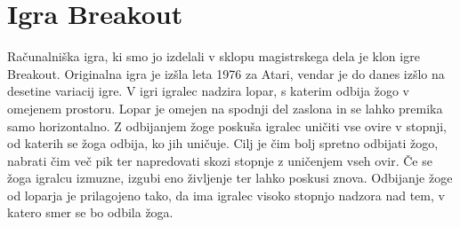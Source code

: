 \documentclass[12pt,a4paper,twoside]{book}
\begin{document}
\section{Igra Breakout}
Računalniška igra, ki smo jo izdelali v sklopu magistrskega dela je klon igre Breakout. Originalna igra je izšla leta 1976 za Atari, vendar je do danes izšlo na desetine variacij igre. V igri igralec nadzira lopar, s katerim odbija žogo v omejenem prostoru. Lopar je omejen na spodnji del zaslona in se lahko premika samo horizontalno. Z odbijanjem žoge poskuša igralec uničiti vse ovire v stopnji, od katerih se žoga odbija, ko jih uničuje. Cilj je čim bolj spretno odbijati žogo, nabrati čim več pik ter napredovati skozi stopnje z uničenjem vseh ovir. Če se žoga igralcu izmuzne, izgubi eno življenje ter lahko poskusi znova. Odbijanje žoge od loparja je prilagojeno tako, da ima igralec visoko stopnjo nadzora nad tem, v katero smer se bo odbila žoga.
\end{document}
